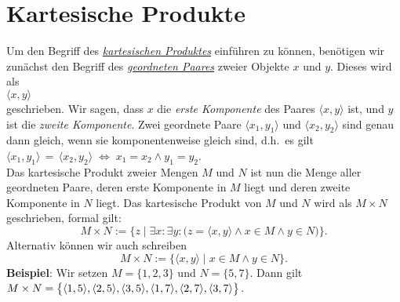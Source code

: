 \section{Kartesische Produkte}
Um den Begriff des 
\href{https://de.wikipedia.org/wiki/Kartesisches_Produkt}{\emph{kartesischen Produktes}}
einf\"{u}hren zu k\"{o}nnen, ben\"{o}tigen wir zun\"{a}chst den Begriff des 
\href{https://de.wikipedia.org/wiki/Geordnetes_Paar}{\emph{geordneten Paares}} zweier Objekte $x$
und $y$.  Dieses wird  als 
\\[0.2cm] 
\hspace*{1.3cm}
$\langle x, y \rangle$ 
\\[0.2cm]
geschrieben.  Wir sagen, dass $x$ die \emph{erste Komponente} des Paares $\langle x, y \rangle$ ist, 
und $y$ ist die \emph{zweite Komponente}.  Zwei geordnete Paare $\langle x_1, y_1 \rangle$ und $\langle x_2, y_2 \rangle$
sind genau dann gleich, wenn sie komponentenweise gleich sind, d.h.~es gilt \\[0.2cm]
\hspace*{1.3cm} $\langle x_1, y_1 \rangle \,=\,\langle x_2, y_2 \rangle  \;\Leftrightarrow\; x_1 = x_2 \wedge y_1 = y_2$. \\[0.2cm]
Das kartesische Produkt zweier Mengen $M$ und $N$ ist nun die Menge aller geordneten
Paare, deren erste Komponente in $M$ liegt und deren zweite Komponente in $N$ liegt.
Das kartesische Produkt von $M$ und $N$ wird als $M \times N$ geschrieben, formal gilt: 
\[ M \times N := \big\{ z \mid \exists x\colon \exists y\colon\bigl(z = \langle x,y\rangle \wedge x\in M \wedge y \in N\bigr) \bigr\}. \]
Alternativ k\"{o}nnen wir auch schreiben
\[ M \times N := \big\{ \langle x,y\rangle \mid  x\in M \wedge y \in N \}. \]
\noindent
\textbf{Beispiel}:  Wir setzen $M = \{ 1, 2, 3 \}$ und $N = \{ 5, 7 \}$. Dann gilt\\[0.2cm]
\hspace*{1.3cm} 
$M \times N = \bigl\{ \pair(1,5),\pair(2,5),\pair(3,5),\pair(1,7),\pair(2,7),\pair(3,7)\bigr\}$.
\vspace{0.2cm}

